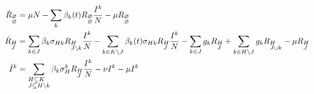 \documentclass{beamer}
\begin{document}
\begin{frame}
\begin{columns}
\begin{column}{0.7 \linewidth}
    \end{column}
  \end{columns}
      
  \begin{tiny}
    \begin{align}
      \dot{R}_{\begin{subarray}{l}\varnothing \\
          \varnothing \end{subarray}} &= \mu N -\sum_k \beta_k(t)
      R_{\begin{subarray}{l}\varnothing \\ \varnothing \end{subarray}}
      \frac{I^k}{N} - \mu R_{\begin{subarray}{l}\varnothing \\
          \varnothing \end{subarray}}  \notag \\
      \dot{R}_{\begin{subarray}{l}H\\ J \end{subarray}} &= \sum_{k \in
            J} \beta_k \sigma_{Hk} R_{\begin{subarray}{l}H \\ J \setminus
              k \end{subarray}} \frac{I^k}{N} -\sum_{k \in K\setminus J} \beta_k(t)
          \sigma_{Hk} R_{\begin{subarray}{l}H\\ J \end{subarray}}
          \frac{I^k}{N} - \sum_{k \in J} g_k R_{\begin{subarray}{l}H \\
              J \end{subarray}} + \sum_{k \in H \setminus J} g_k
          R_{\begin{subarray}{l}H\\ J\cup k \end{subarray}} -\mu
          R_{\begin{subarray}{l}H\\J \end{subarray}} \notag \\
          \dot{I}^k &= \sum_{\begin{subarray}{l}H \subseteq K \\ J
              \subseteq H \setminus k  \end{subarray}} \beta_k
          \sigma_H^k R_{\begin{subarray}{l}H \\ J \end{subarray}}
          \frac{I^k}{N} -\nu I^k -\mu I^k \notag
        \end{align}
      \end{tiny}
      

\end{frame}
\end{document}
